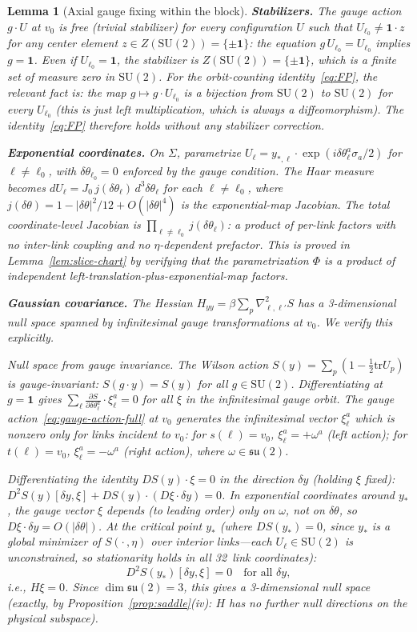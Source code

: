 \documentclass[11pt]{article}
\newtheorem{lemma}[theorem]{Lemma}
\theoremstyle{definition}
\newcommand{\SU}{\mathrm{SU}}
\newcommand{\su}{\mathfrak{su}}
\newcommand{\tr}{\mathrm{tr}}
\begin{document}
\begin{lemma}[Axial gauge fixing within the block]
\textbf{Stabilizers.}
The gauge action $g\cdot U$ at $v_0$ is \emph{free}
(trivial stabilizer) for every configuration $U$ such that
$U_{\ell_0}\ne\mathbf{1}\cdot z$ for any center element
$z\in Z(\SU(2))=\{\pm\mathbf{1}\}$: the equation
$g\,U_{\ell_0}=U_{\ell_0}$ implies $g=\mathbf{1}$.
Even if $U_{\ell_0}=\mathbf{1}$, the stabilizer is
$Z(\SU(2))=\{\pm\mathbf{1}\}$, which is a finite set of
measure zero in $\SU(2)$.  For the orbit-counting
identity~\eqref{eq:FP}, the relevant fact is: the map
$g\mapsto g\cdot U_{\ell_0}$ is a bijection from $\SU(2)$
to $\SU(2)$ for every $U_{\ell_0}$
(this is just left multiplication, which is always a
diffeomorphism).  The identity~\eqref{eq:FP} therefore
holds without any stabilizer correction.

\textbf{Exponential coordinates.}
On $\Sigma$, parametrize $U_\ell=y_{*,\ell}\cdot
\exp(i\delta\theta_\ell^a\sigma_a/2)$ for $\ell\ne\ell_0$, with
$\delta\theta_{\ell_0}=0$ enforced by the gauge condition.  The Haar
measure becomes $dU_\ell=J_0\,j(\delta\theta_\ell)\,d^3\delta\theta_\ell$
for each $\ell\ne\ell_0$, where $j(\delta\theta)
=1-|\delta\theta|^2/12+O(|\delta\theta|^4)$ is the exponential-map
Jacobian.  The total coordinate-level Jacobian is
$\prod_{\ell\ne\ell_0}j(\delta\theta_\ell)$: a product of
per-link factors with no inter-link coupling and no
$\eta$-dependent prefactor.  This is proved in
Lemma~\ref{lem:slice-chart} by verifying that the
parametrization $\Phi$ is a product of independent
left-translation-plus-exponential-map factors.

\textbf{Gaussian covariance.}
The Hessian $H_{yy}=\beta\sum_p\nabla_{\ell,\ell'}^2 S$ has a
3-dimensional null space spanned by infinitesimal gauge
transformations at $v_0$.  We verify this explicitly.

\emph{Null space from gauge invariance.}
The Wilson action $S(y)=\sum_p(1-\frac{1}{2}\tr U_p)$ is
gauge-invariant: $S(g\cdot y)=S(y)$ for all $g\in\SU(2)$.
Differentiating at $g=\mathbf{1}$ gives
$\sum_\ell\frac{\partial S}{\partial\delta\theta_\ell^a}
\cdot\xi_\ell^a=0$ for all $\xi$ in the infinitesimal gauge
orbit.  The gauge action~\eqref{eq:gauge-action-full} at $v_0$
generates the infinitesimal vector $\xi_\ell^a$ which is nonzero
only for links incident to $v_0$: for $s(\ell)=v_0$,
$\xi_\ell^a=+\omega^a$ (left action); for $t(\ell)=v_0$,
$\xi_\ell^a=-\omega^a$ (right action), where $\omega\in\su(2)$.

Differentiating the identity
$DS(y)\cdot\xi=0$ in the direction $\delta y$
(holding $\xi$ fixed):
$D^2 S(y)[\delta y,\xi]+DS(y)\cdot(D\xi\cdot\delta y)=0$.
In exponential coordinates around $y_*$, the gauge vector $\xi$
depends (to leading order) only on $\omega$, not on $\delta\theta$,
so $D\xi\cdot\delta y=O(|\delta\theta|)$.
At the critical point $y_*$ (where $DS(y_*)=0$, since $y_*$ is a
global minimizer of $S(\cdot\,,\eta)$ over interior links---each
$U_\ell\in\SU(2)$ is unconstrained, so stationarity holds in all
32~link coordinates):
\[
D^2 S(y_*)[\delta y,\xi]=0\quad\text{for all }\delta y,
\]
i.e., $H\xi=0$.  Since $\dim\su(2)=3$,
this gives a 3-dimensional null space (exactly, by
Proposition~\ref{prop:saddle}(iv): $H$ has no further null
directions on the physical subspace).


\end{lemma}
\end{document}
